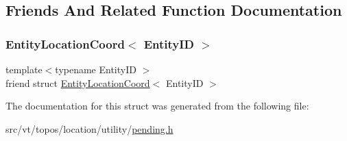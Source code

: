 \subsection{Friends And Related Function Documentation}
\mbox{\label{structvt_1_1location_1_1_pending_location_lookup_abf8115ee4795af8b482a657aa6195a6a}} 
\subsubsection{\texorpdfstring{Entity\+Location\+Coord$<$ Entity\+I\+D $>$}{EntityLocationCoord< EntityID >}}
{\footnotesize\ttfamily template$<$typename Entity\+ID $>$ \\
friend struct \hyperlink{structvt_1_1location_1_1_entity_location_coord}{Entity\+Location\+Coord}$<$ Entity\+ID $>$\hspace{0.3cm}{\ttfamily [friend]}}



The documentation for this struct was generated from the following file\+:\begin{DoxyCompactItemize}
\item 
src/vt/topos/location/utility/\hyperlink{pending_8h}{pending.\+h}\end{DoxyCompactItemize}
